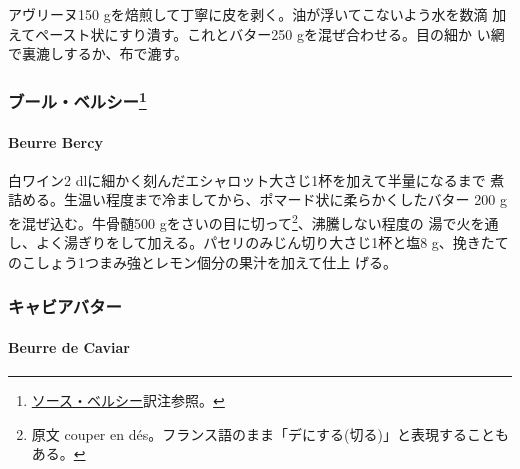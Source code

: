 \begin{recette}
アヴリーヌ150 gを焙煎して丁寧に皮を剥く。油が浮いてこないよう水を数滴
加えてペースト状にすり潰す。これとバター250 gを混ぜ合わせる。目の細か
い網で裏漉しするか、布で漉す。

\maeaki

\hypertarget{ux30d6ux30fcux30ebux30d9ux30ebux30b7ux30fc9}{%
\subsubsection[ブール・ベルシー]{\texorpdfstring{ブール・ベルシー\footnote{\protect\hyperlink{sauce-bercy}{ソース・ベルシー}訳注参照。}}{ブール・ベルシー}}\label{ux30d6ux30fcux30ebux30d9ux30ebux30b7ux30fc9}}

\hypertarget{beurre-bercy}{%
\paragraph{Beurre Bercy}\label{beurre-bercy}}


白ワイン2 dlに細かく刻んだエシャロット大さじ1杯を加えて半量になるまで
煮詰める。生温い程度まで冷ましてから、ポマード状に柔らかくしたバター 200
gを混ぜ込む。牛骨髄500 gをさいの目に切って\footnote{原文 couper en
  dés。フランス語のまま「デにする(切る)」と表現することもある。}、沸騰しない程度の
湯で火を通し、よく湯ぎりをして加える。パセリのみじん切り大さじ1杯と塩8
g、挽きたてのこしょう1つまみ強とレモン\undemi{}個分の果汁を加えて仕上
げる。

\maeaki

\hypertarget{ux30adux30e3ux30d3ux30a2ux30d0ux30bfux30fc}{%
\subsubsection{キャビアバター}\label{ux30adux30e3ux30d3ux30a2ux30d0ux30bfux30fc}}

\hypertarget{beurre-de-caviar}{%
\paragraph{Beurre de Caviar}\label{beurre-de-caviar}}



\end{recette}
